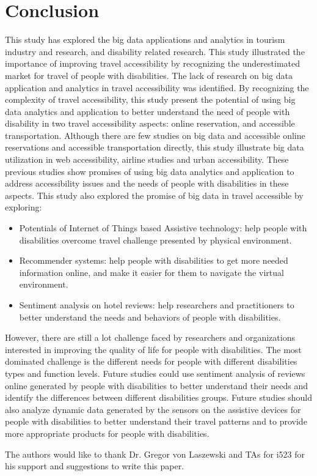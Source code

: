 \section{Conclusion}

This study has explored the big data applications and analytics  in tourism industry and 
research, and disability related research. This study illustrated the importance of 
improving travel accessibility by recognizing the underestimated market for travel of
people with disabilities. The lack of research on big data application and analytics 
in travel accessibility was identified. By recognizing the complexity of travel 
accessibility, this study present the potential of using big data analytics and 
application to better understand the need of people with disability 
in two travel accessibility aspects: online reservation, and accessible 
transportation. Although there are few studies on big data and accessible 
online reservations and accessible transportation directly, this study 
illustrate big data utilization in web accessibility, airline studies and urban 
accessibility. These previous studies show promises of using big data analytics 
and application to address accessibility issues and the needs of people with 
disabilities in these aspects. This study also explored the promise of big 
data in travel accessible by exploring:

\begin{itemize}
  \item Potentials of Internet of Things based Assistive technology: help people with disabilities overcome travel challenge presented by physical environment.
  \item Recommender systems: help people with disabilities to get more needed information online, and make it easier for them to navigate the virtual environment.
  \item Sentiment analysis on hotel reviews: help researchers and practitioners to better understand the needs and behaviors of people with disabilities. 
\end{itemize}

However, there are still a lot challenge faced by researchers and organizations interested in
improving the quality of life for people with disabilities. The most dominated challenge is
the different needs for people with different disabilities types and function levels. Future
studies could use sentiment analysis of reviews online generated by people with disabilities 
to better understand their needs and identify the differences between different disabilities
groups. Future studies should also analyze dynamic data generated by the sensors on the 
assistive devices for people with disabilities to better understand their travel patterns
and to provide more appropriate products for people with disabilities. 

\begin{acks}

  The authors would like to thank Dr. Gregor von Laszewski and TAs for i523 for his
  support and suggestions to write this paper.

\end{acks}


 

\appendix
